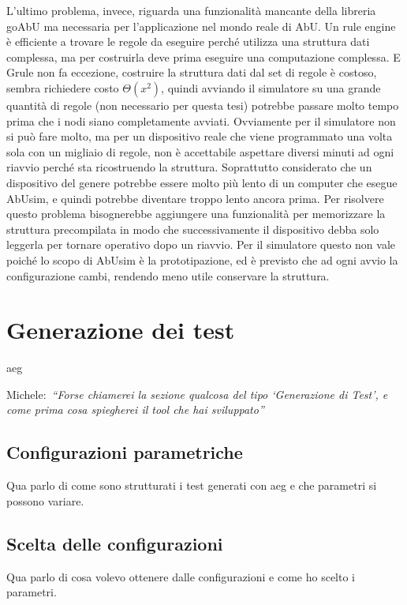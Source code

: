 \documentclass[12pt, a4paper]{article}
\newcommand{\michele}[1]{{\color{red}Michele:~}{\itshape``{#1}''}}
\begin{document}
L'ultimo problema, invece, riguarda una funzionalità mancante della libreria goAbU ma necessaria per l'applicazione nel mondo reale di AbU.
Un rule engine è efficiente a trovare le regole da eseguire perché utilizza una struttura dati complessa, ma per costruirla deve prima eseguire una computazione complessa. E Grule non fa eccezione, costruire la struttura dati dal set di regole è costoso, sembra richiedere costo $\Theta(x^2)$, quindi avviando il simulatore su una grande quantità di regole (non necessario per questa tesi) potrebbe passare molto tempo prima che i nodi siano completamente avviati.
Ovviamente per il simulatore non si può fare molto, ma per un dispositivo reale che viene programmato una volta sola con un migliaio di regole, non è accettabile aspettare diversi minuti ad ogni riavvio perché sta ricostruendo la struttura. Soprattutto considerato che un dispositivo del genere potrebbe essere molto più lento di un computer che esegue AbUsim, e quindi potrebbe diventare troppo lento ancora prima.
Per risolvere questo problema bisognerebbe aggiungere una funzionalità per memorizzare la struttura precompilata in modo che successivamente il dispositivo debba solo leggerla per tornare operativo dopo un riavvio. Per il simulatore questo non vale poiché lo scopo di AbUsim è la prototipazione, ed è previsto che ad ogni avvio la configurazione cambi, rendendo meno utile conservare la struttura.

\section{Generazione dei test}

aeg

\michele{Forse chiamerei la sezione qualcosa del tipo `Generazione di Test', e come prima cosa spiegherei il tool che hai sviluppato}

\subsection{Configurazioni parametriche}

Qua parlo di come sono strutturati i test generati con aeg e che parametri si possono variare.

\subsection{Scelta delle configurazioni}

Qua parlo di cosa volevo ottenere dalle configurazioni e come ho scelto i parametri.
\end{document}

